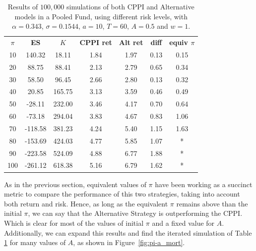 \begin{table}[h]
\centering
\caption{Results of $100,000$ simulations of both CPPI and Alternative models in a Pooled Fund, using different risk levels, with $\alpha = 0.343$, $\sigma = 0.1544$, $a = 10$, $T = 60$, $A = 0.5$ and $w = 1$.}
\label{tab:cppi_alt_mort}
\begin{tabular}{ccccccc}
\textbf{$\pi$} & \textbf{ES } & \textbf{$K$} & \textbf{CPPI ret} & \textbf{Alt ret} & \textbf{diff}  & \textbf{equiv $\pi$}\\
10  & 140.32  & 18.11 & 1.84 & 1.97 & 0.13 & 0.15 \\
20  & 88.75  & 88.41 & 2.13 & 2.79 & 0.65 & 0.34 \\
30  & 58.50  & 96.45 & 2.66 & 2.80 & 0.13 & 0.32 \\
40  & 20.85  & 165.75  & 3.13 & 3.59 & 0.46 & 0.49 \\
50  & -28.11 & 232.00  & 3.46 & 4.17 & 0.70 & 0.64 \\
60  & -73.18 & 294.04 & 3.83 & 4.67 & 0.83 & 1.06 \\
70  & -118.58 & 381.23 & 4.24 & 5.40 & 1.15 & 1.63 \\
80  & -153.69 & 424.03 & 4.77 & 5.85  & 1.07 & *                 \\
90  & -223.58 & 524.09 & 4.88 & 6.77 & 1.88 & *                 \\
100 & -261.12   & 618.38 & 5.16 & 6.79 & 1.62 & *

\end{tabular}
\end{table}



As in the previous section, equivalent values of $\pi$ have been working as a succinct metric to compare the performance of this two strategies, taking into account both return and risk. Hence, as long as the equivalent $\pi$ remains above than the initial $\pi$, we can say that the Alternative Strategy is outperforming
the CPPI. Which is clear for most of the values of initial $\pi$ and a fixed value for $A$. Additionally, we can expand this results and find the iterated simulation of Table \ref{tab:cppi_alt_mort} for many values of $A$, as shown in Figure~\ref{fig:pi-a_mort}.

